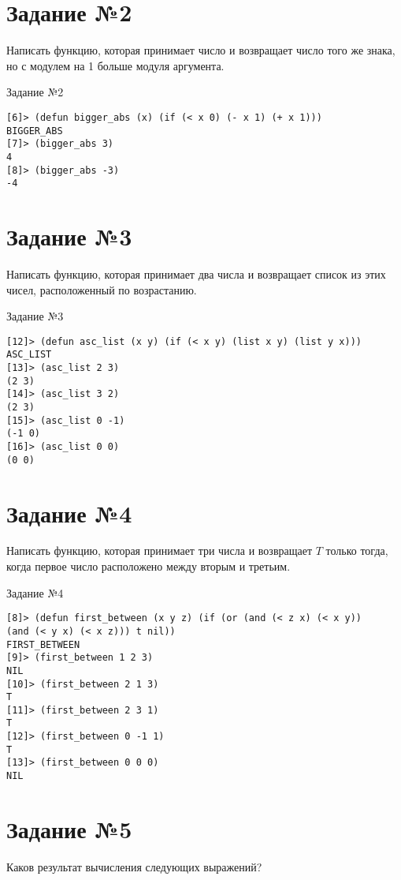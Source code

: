 \section{Задание №2}
Написать функцию, которая принимает число и возвращает число того же знака, но с модулем на 1 больше модуля аргумента.

\begin{code}
\caption{Задание №2}
\label{code:bf2}
\begin{verbatim}
[6]> (defun bigger_abs (x) (if (< x 0) (- x 1) (+ x 1)))
BIGGER_ABS
[7]> (bigger_abs 3)
4
[8]> (bigger_abs -3)
-4
\end{verbatim}
\end{code}

\section{Задание №3}
Написать функцию, которая принимает два числа и возвращает список из этих чисел, расположенный по возрастанию.

\begin{code}
\caption{Задание №3}
\label{code:bf3}
\begin{verbatim}
[12]> (defun asc_list (x y) (if (< x y) (list x y) (list y x)))
ASC_LIST
[13]> (asc_list 2 3)
(2 3)
[14]> (asc_list 3 2)
(2 3)
[15]> (asc_list 0 -1)
(-1 0)
[16]> (asc_list 0 0)
(0 0)
\end{verbatim}
\end{code}

\section{Задание №4}
Написать функцию, которая принимает три числа и возвращает $T$ только тогда, когда первое число расположено между вторым и третьим.

\begin{code}
\caption{Задание №4}
\label{code:bf4}
\begin{verbatim}
[8]> (defun first_between (x y z) (if (or (and (< z x) (< x y))
(and (< y x) (< x z))) t nil))
FIRST_BETWEEN
[9]> (first_between 1 2 3)
NIL
[10]> (first_between 2 1 3)
T
[11]> (first_between 2 3 1)
T
[12]> (first_between 0 -1 1)
T
[13]> (first_between 0 0 0)
NIL
\end{verbatim}
\end{code}

\section{Задание №5}
Каков результат вычисления следующих выражений?

